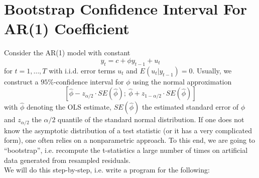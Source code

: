 \documentclass[a4paper]{scrartcl}
\begin{document}
\newpage

\section[Bootstrap Confidence Interval For AR(1) Coefficient]{Bootstrap Confidence Interval For AR(1) Coefficient}\label{ex:BootstrapCI}

Consider the AR(1) model with constant
\begin{equation*}
y_{t}=c +\phi y_{t-1}+u_{t}
\end{equation*}
for $t=1,\ldots ,T$ with i.i.d. error terms $u_{t}$ and $E(u_{t}|y_{t-1})=0$.
Usually, we construct a $95\%$-confidence interval for $\phi$ using the normal approximation
\begin{equation*}
\left[ \hat{\phi}-z_{\alpha/2}\cdot SE(\hat{\phi});\ \hat{\phi}+z_{1-\alpha/2}\cdot SE(\hat{\phi})\right]
\end{equation*}
with $\hat{\phi}$ denoting the OLS estimate, $SE(\hat{\phi})$ the estimated standard error of $\phi$ and $z_{\alpha/2}$ the $\alpha/2$ quantile of the standard normal distribution. If one does not know the asymptotic distribution of a test statistic (or it has a very complicated form), one often relies on a nonparametric approach. To this end, we are going to \enquote{bootstrap}, i.e. recompute the t-statistics a large number of times on artificial data generated from resampled residuals.\\
We will do this step-by-step, i.e. write a program for the following:
\end{document}
